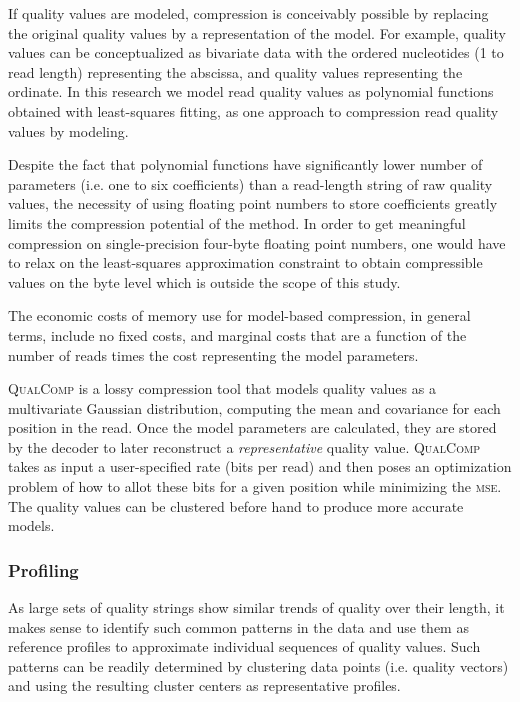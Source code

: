 If quality values are modeled, compression is conceivably possible by
replacing the original quality values by a representation of the
model. For example, quality values can be conceptualized as bivariate
data with the ordered nucleotides (1 to read length) representing the
abscissa, and quality values representing the ordinate. In this
research we model read quality values as polynomial functions obtained
with least-squares fitting, as one approach to compression read
quality values by modeling.

Despite the fact that polynomial functions have significantly lower
number of parameters (i.e. one to six coefficients) than a read-length
string of raw quality values, the necessity of using floating point
numbers to store coefficients greatly limits the compression potential
of the method. In order to get meaningful compression on
single-precision four-byte floating point numbers, one would have to
relax on the least-squares approximation constraint to obtain
compressible values on the byte level which is outside the scope of
this study.

The economic costs of memory use for model-based compression, in
general terms, include no fixed costs, and marginal costs that are a
function of the number of reads times the cost representing the model
parameters.

\textsc{QualComp} is a lossy compression tool that models quality values as a multivariate Gaussian distribution, computing the mean and covariance for each position in the read\cite{Ochoa:2013rt}.
Once the model parameters are calculated, they are stored by the decoder to later reconstruct a \emph{representative} quality value.
\textsc{QualComp} takes as input a user-specified rate (bits per read) and then poses an optimization problem of how to allot these bits for a given position while minimizing the \textsc{mse}.
The quality values can be clustered before hand to produce more accurate models.

\subsubsection{Profiling}

As large sets of quality strings show similar trends of quality over
their length, it makes sense to identify such common patterns in the
data and use them as reference profiles to approximate individual
sequences of quality values. Such patterns can be readily determined by
clustering data points (i.e. quality vectors) and using the resulting
cluster centers as representative profiles.

